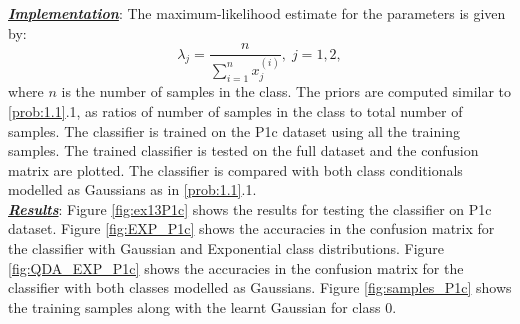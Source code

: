 \documentclass[12pt, a4 paper]{article}
\begin{document}
\underline{\it \bfseries Implementation}: The maximum-likelihood estimate for the parameters is given by:
\begin{equation}
	\lambda_{j} = \frac{n}{\sum_{i=1}^{n} x_{j}^{(i)}}, \; j=1,2,
\label{eq:mleExp}
\end{equation}
where $n$ is the number of samples in the class. The priors are computed similar to \ref{prob:1.1}.1, as ratios of number of samples in the class to total number of samples. The classifier is trained on the P1c dataset using all the training samples. The trained classifier is tested on the full dataset and the confusion matrix are plotted. The classifier is compared with both class conditionals modelled as Gaussians as in \ref{prob:1.1}.1. \\

\underline{\it \bfseries Results}: Figure \ref{fig:ex13P1c} shows the results for testing the classifier on P1c dataset. Figure \ref{fig:EXP_P1c} shows the accuracies in the confusion matrix for the classifier with Gaussian and Exponential class distributions. Figure \ref{fig:QDA_EXP_P1c} shows the accuracies in the confusion matrix for the classifier with both classes modelled as Gaussians. Figure \ref{fig:samples_P1c} shows the training samples along with the learnt Gaussian for class $0$. \\
\end{document}
